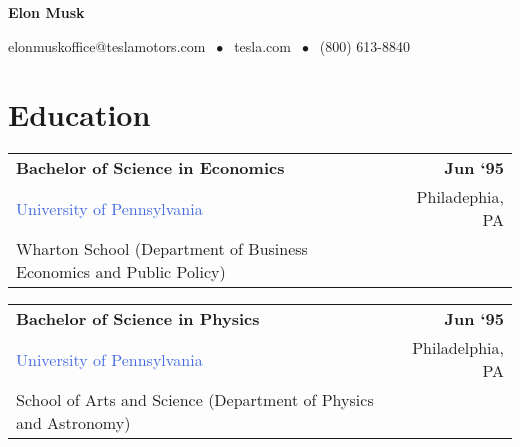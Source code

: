 \documentclass[10pt]{article}
\newcommand{\highlightcolor}{RoyalBlue}
\newcommand{\tabularxwidth}{\textwidth}
\begin{document}
    \centerline{ \color{\highlightcolor} \huge \textbf{Elon Musk}}

    \vspace{.5em}

    {\color{\highlightcolor} \centerline{elonmuskoffice@teslamotors.com $\; \bullet \;$ tesla.com $\; \bullet \;$ (800) 613-8840} }

    \noindent{\rule{\linewidth}{.2em}}



    
        \section{Education}

    
        \begin{tabularx}{\tabularxwidth}{X r}
            \textbf{Bachelor of Science in Economics} & \textbf{
    Jun ‘95} \\
            \quad \textcolor{\highlightcolor}{University of Pennsylvania} & 
    Philadephia, 
        PA \\
            \quad Wharton School (Department of Business Economics and Public Policy) & \\
            
            
        \end{tabularx}

        
            \vspace{.5em}
        

    
        \begin{tabularx}{\tabularxwidth}{X r}
            \textbf{Bachelor of Science in Physics} & \textbf{
    Jun ‘95} \\
            \quad \textcolor{\highlightcolor}{University of Pennsylvania} & 
    Philadelphia, 
        PA \\
            \quad School of Arts and Science (Department of Physics and Astronomy) & \\
            
            
        \end{tabularx}
\end{document}

